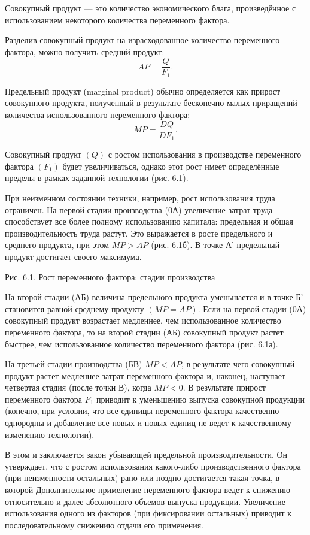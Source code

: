 Совокупный продукт — это количество экономического блага, произведённое с
использованием некоторого количества переменного фактора.

Разделив совокупный продукт на израсходованное количество переменного фактора,
можно получить средний продукт:
\[
    AP = \frac{Q}{F_1}.
\]

Предельный продукт (marginal product) обычно определяется как прирост
совокупного продукта, полученный в результате бесконечно малых приращений
количества использованного переменного фактора:
\[
    MP = \frac{DQ}{DF_1}.
\]

Совокупный продукт \( (Q) \) с ростом использования в производстве переменного
фактора \( (F_1) \) будет увеличиваться, однако этот рост имеет определённые
пределы в рамках заданной технологии (рис. 6.1).

При неизменном состоянии техники, например, рост использования труда ограничен.
На первой стадии производства (0А) увеличение затрат труда способствует все
более полному использованию капитала: предельная и общая производительность
труда растут. Это выражается в росте предельного и среднего продукта, при этом
\( MP > AP \) (рис. 6.1б). В точке А' предельный продукт достигает своего
максимума.

Рис. 6.1. Рост переменного фактора: стадии производства

На второй стадии (АБ) величина предельного продукта уменьшается и в точке Б'
становится равной среднему продукту \( (MP = AP) \). Если на первой стадии (0А)
совокупный продукт возрастает медленнее, чем использованное количество
переменного фактора, то на второй стадии (АБ) совокупный продукт растет
быстрее, чем использованное количество переменного фактора (рис. 6.1а).

На третьей стадии производства (БВ) \( MP < AP \), в результате чего совокупный
продукт растет медленнее затрат переменного фактора и, наконец, наступает
четвертая стадия (после точки В), когда \( MP < 0 \). В результате прирост
переменного фактора \( F_1 \) приводит к уменьшению выпуска совокупной продукции
(конечно, при условии, что все единицы переменного фактора качественно
однородны и добавление все новых и новых единиц не ведет к качественному
изменению технологии).

В этом и заключается закон убывающей предельной производительности. Он
утверждает, что с ростом использования какого-либо производственного фактора
(при неизменности остальных) рано или поздно достигается такая точка, в которой
Дополнительное применение переменного фактора ведет к снижению относительно и
далее абсолютного объемов выпуска продукции. Увеличение использования одного из
факторов (при фиксировании остальных) приводит к последовательному снижению
отдачи его применения.

